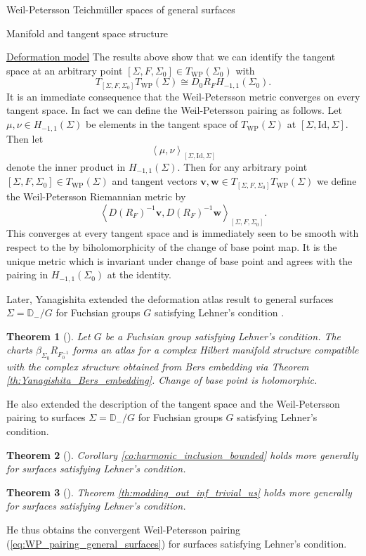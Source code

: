 \documentclass[12pt]{amsart}
\newcommand{\disk}{\ensuremath{\mathbb{D}} } %
\newcommand{\riem}{\Sigma}  %
\theoremstyle{plain}
\newtheorem{theorem}{Theorem}[section]
\theoremstyle{definition}
\theoremstyle{remark}
\numberwithin{equation}{section} %
\numberwithin{figure}{section} %
\begin{document}
\begin{section}{Weil-Petersson Teichm\"uller spaces of general surfaces}
\begin{subsection}{Manifold and tangent space structure}
\begin{subsubsection}{{\underline{Deformation model}}}
  The results above show that we can identify the tangent space at an arbitrary point $[\riem,F,\riem_0] \in T_{\mathrm{WP}}(\riem_0)$ with   
  \[   T_{[\riem,F,\riem_0]} T_{\mathrm{WP}}(\riem) \cong  D_0 R_{F} H_{-1,1}(\riem_0).     \]
  It is an immediate consequence that the Weil-Petersson metric converges on every tangent space. In fact we can define the Weil-Petersson pairing as follows. Let $\mu,\nu \in H_{-1,1}(\riem)$ be elements in the tangent space of $T_{\mathrm{WP}}(\riem)$ at $[\riem,\mathrm{Id},\riem]$. Then let 
  \[ \left< \mu, \nu \right>_{[\riem,\mathrm{Id},\riem]}   \]
  denote the inner product in $H_{-1,1}(\riem)$.  Then for any arbitrary point $[\riem,F,\riem_0] \in T_{\mathrm{WP}}(\riem)$ and tangent vectors $\mathbf{v},\mathbf{w} \in  T_{[\riem,F,\riem_0]} T_{\mathrm{WP}}(\riem)$
  we define the Weil-Petersson Riemannian metric by 
  \begin{equation} \label{eq:WP_pairing_general_surfaces}  \left< D (R_{F})^{-1}\mathbf{v}, D (R_{F})^{-1} \mathbf{w} \right>_{[\riem,F,\riem_0]}.  
  \end{equation}
  This converges at every tangent space and is immediately seen to be smooth with respect to the by biholomorphicity of the change of base point map. 
  It is the unique metric which is invariant under change of base point and agrees with the pairing in $H_{-1,1}(\riem_0)$ at the identity.
  

  Later, Yanagishita extended the deformation atlas result to general surfaces $\riem=\disk_-/G$ for Fuchsian groups $G$ satisfying Lehner's condition \cite{Yanagishita_Kahler}.
  \begin{theorem}[\cite{Yanagishita_Kahler}] \label{th:Yanagishita_WP_atlas_deformation} Let $G$ be a Fuchsian group  satisfying Lehner's condition. The charts $\beta_{\riem_0} R_{F_0^{-1}}$ forms an atlas for a complex Hilbert manifold structure compatible with the complex structure obtained from Bers embedding via \emph{Theorem \ref{th:Yanagishita_Bers_embedding}}.
  Change of base point is holomorphic. 
  \end{theorem}
  He also extended the description of the tangent space and the Weil-Petersson pairing to surfaces $\riem = \disk_-/G$ for Fuchsian groups $G$ satisfying Lehner's condition. 
  \begin{theorem}[\cite{Yanagishita_Kahler}]
      \emph{Corollary \ref{co:harmonic_inclusion_bounded}} holds more generally for surfaces satisfying Lehner's condition.
  \end{theorem}
  \begin{theorem}[\cite{Yanagishita_Kahler}]
     \emph{Theorem \ref{th:modding_out_inf_trivial_us}} holds more generally for surfaces satisfying Lehner's condition. 
  \end{theorem}
  He thus obtains the convergent Weil-Petersson pairing (\ref{eq:WP_pairing_general_surfaces}) for surfaces satisfying Lehner's condition.


\end{subsubsection}
\end{subsection}
\end{section}
\end{document}
